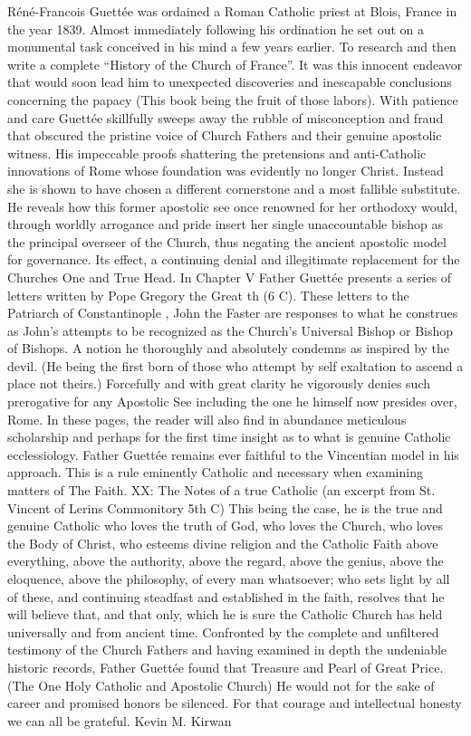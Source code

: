 
Réné-Francois Guettée was ordained a Roman Catholic priest at Blois, France in the year 1839. Almost immediately following his ordination he set out on a monumental task conceived in his mind a few years earlier. To research and then write a complete “History of the Church of France”. It was this innocent endeavor that would soon lead him to unexpected discoveries and inescapable conclusions concerning the papacy (This book being the fruit of those labors). With patience and care Guettée skillfully sweeps away the rubble of misconception and fraud that obscured the pristine voice of Church Fathers and their genuine apostolic witness. His impeccable proofs shattering the pretensions and anti-Catholic innovations of Rome whose foundation was evidently no longer Christ. Instead she is shown to have chosen a different cornerstone and a most fallible substitute. He reveals how this former apostolic see once renowned for her orthodoxy would, through worldly arrogance and pride insert her single unaccountable bishop as the principal overseer of the Church, thus negating the ancient apostolic model for governance. Its effect, a continuing denial and illegitimate replacement for the Churches One and True Head. In Chapter V Father Guettée presents a series of letters written by Pope Gregory the Great th (6 C). These letters to the Patriarch of Constantinople , John the Faster are responses to what he construes as John’s attempts to be recognized as the Church’s Universal Bishop or Bishop of Bishops. A notion he thoroughly and absolutely condemns as inspired by the devil. (He being the first born of those who attempt by self exaltation to ascend a place not theirs.) Forcefully and with great clarity he vigorously denies such prerogative for any Apostolic See including the one he himself now presides over, Rome. In these pages, the reader will also find in abundance meticulous scholarship and perhaps for the first time insight as to what is genuine Catholic ecclessiology. Father Guettée remains ever faithful to the Vincentian model in his approach. This is a rule eminently Catholic and necessary when examining matters of The Faith. XX: The Notes of a true Catholic (an excerpt from St. Vincent of Lerins Commonitory 5th C) This being the case, he is the true and genuine Catholic who loves the truth of God, who loves the Church, who loves the Body of Christ, who esteems divine religion and the Catholic Faith above everything, above the authority, above the regard, above the genius, above the eloquence, above the philosophy, of every man whatsoever; who sets light by all of these, and continuing steadfast and established in the faith, resolves that he will believe that, and that only, which he is sure the Catholic Church has held universally and from ancient time. Confronted by the complete and unfiltered testimony of the Church Fathers and having examined in depth the undeniable historic records, Father Guettée found that Treasure and Pearl of Great Price. (The One Holy Catholic and Apostolic Church) He would not for the sake of career and promised honors be silenced. For that courage and intellectual honesty we can all be grateful. Kevin M. Kirwan


